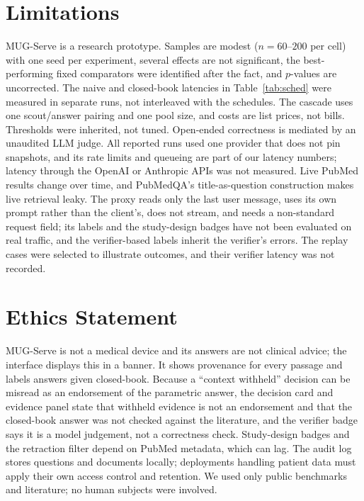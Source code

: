 \documentclass[11pt]{article}
\begin{document}
\section*{Limitations}
MUG-Serve is a research prototype. Samples are modest ($n{=}60$--$200$ per cell)
with one seed per experiment, several effects are not significant, the
best-performing fixed comparators were identified after the fact, and $p$-values
are uncorrected. The naive and closed-book latencies in Table~\ref{tab:sched}
were measured in separate runs, not interleaved with the schedules. The cascade
uses one scout/answer pairing and one pool size, and costs are list prices, not
bills. Thresholds were inherited, not tuned. Open-ended correctness is mediated
by an unaudited LLM judge. All reported runs used one provider that does not pin snapshots, and its rate
limits and queueing are part of our latency numbers; latency through the OpenAI or
Anthropic APIs was not measured.
Live PubMed results change over time, and PubMedQA's title-as-question
construction makes live retrieval leaky. The proxy reads only the last user
message, uses its own prompt rather than the client's, does not stream, and
needs a non-standard request field; its labels and the study-design badges have
not been evaluated on real traffic, and the verifier-based labels inherit the
verifier's errors. The replay cases were selected to illustrate outcomes, and
their verifier latency was not recorded.

\section*{Ethics Statement}
MUG-Serve is not a medical device and its answers are not clinical advice; the
interface displays this in a banner. It shows provenance for every passage and
labels answers given closed-book. Because a ``context withheld'' decision can be
misread as an endorsement of the parametric answer, the decision card and
evidence panel state that withheld evidence is not an endorsement and that the
closed-book answer was not checked against the literature, and the verifier
badge says it is a model judgement, not a correctness check. Study-design badges
and the retraction filter depend on PubMed metadata, which can lag. The audit
log stores questions and documents locally; deployments handling patient data
must apply their own access control and retention. We used only public
benchmarks and literature; no human subjects were involved.


\end{document}

